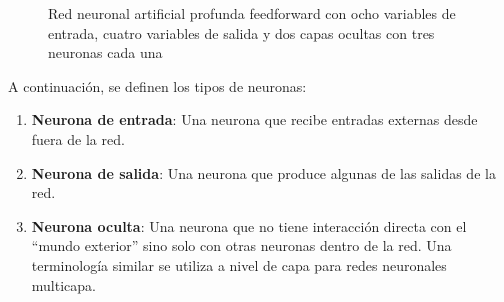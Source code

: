 \documentclass[
  us-letterpaper,
]{scrreprt}
\theoremstyle{definition}
\theoremstyle{plain}
\theoremstyle{plain}
\theoremstyle{definition}
\theoremstyle{remark}
\begin{document}
\begin{figure}


\caption{\label{fig-rnp}Red neuronal artificial profunda feedforward con
ocho variables de entrada, cuatro variables de salida y dos capas
ocultas con tres neuronas cada una}

\end{figure}%

A continuación, se definen los tipos de neuronas:

\begin{enumerate}
\def\labelenumi{\arabic{enumi}.}
\item
  \textbf{Neurona de entrada}: Una neurona que recibe entradas externas
  desde fuera de la red.
\item
  \textbf{Neurona de salida}: Una neurona que produce algunas de las
  salidas de la red.
\item
  \textbf{Neurona oculta}: Una neurona que no tiene interacción directa
  con el ``mundo exterior'' sino solo con otras neuronas dentro de la
  red. Una terminología similar se utiliza a nivel de capa para redes
  neuronales multicapa.
\end{enumerate}
\end{document}
